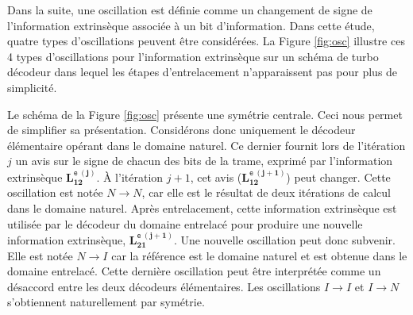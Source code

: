 

Dans la suite, une oscillation est définie comme un changement de signe de l'information extrinsèque associée à un bit
d'information. Dans cette étude, quatre types d'oscillations peuvent être considérées. La Figure 
\ref{fig:osc} illustre ces 4 types d’oscillations pour l'information extrinsèque sur un schéma de turbo décodeur dans 
lequel les étapes d'entrelacement n’apparaissent pas pour plus de simplicité.

Le schéma de la Figure \ref{fig:osc} présente une symétrie centrale. Ceci nous permet de simplifier
sa présentation. Considérons donc uniquement le décodeur élémentaire opérant dans le domaine naturel. Ce dernier 
fournit lors de l'itération $j$ un avis sur le signe de chacun des bits de la trame, exprimé par l'information extrinsèque $\mathbf{L_{12}^{\texttt{e}\ (j)}}$. À l'itération $j+1$, cet avis ($\mathbf{L_{12}^{\texttt{e}\ (j+1)}}$) peut
changer. Cette oscillation est notée $N\rightarrow N$, car elle est le résultat de deux itérations de calcul dans le 
domaine naturel. Après entrelacement, cette information extrinsèque est utilisée par le décodeur du domaine entrelacé 
pour produire une nouvelle information extrinsèque, $\mathbf{L_{21}^{\texttt{e}\ (j+1)}}$. Une nouvelle oscillation peut donc subvenir. Elle est notée $N\rightarrow I$
car la référence est le domaine naturel et est obtenue dans le domaine entrelacé. Cette dernière oscillation peut être 
interprétée comme un désaccord entre les deux décodeurs élémentaires. Les oscillations $I\rightarrow I$ et $I\rightarrow N$
s'obtiennent naturellement par symétrie.

